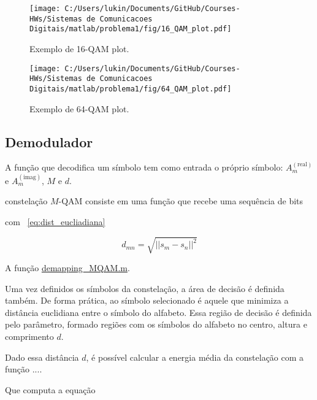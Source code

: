 \clearpage

\begin{figure}[!ht]
    \centering
    \texttt{[image: C:/Users/lukin/Documents/GitHub/Courses-HWs/Sistemas de Comunicacoes Digitais/matlab/problema1/fig/16\_QAM\_plot.pdf]}
    \caption{Exemplo de 16-QAM plot.}
    \label{fig:16_QAM_plot}
\end{figure}

\begin{figure}[!ht]
    \centering
    \texttt{[image: C:/Users/lukin/Documents/GitHub/Courses-HWs/Sistemas de Comunicacoes Digitais/matlab/problema1/fig/64\_QAM\_plot.pdf]}
    \caption{Exemplo de 64-QAM plot.}
    \label{fig:64_QAM_plot}
\end{figure}

\clearpage

\subsection{Demodulador}


A função que decodifica um símbolo tem como entrada o próprio símbolo: $A_m^{(\text{real})}$ e $A_m^{(\text{imag})}$, $M$ e $d$.

constelação $M$-QAM consiste em uma função que recebe uma sequência de bits

com ~\ref{eq:dist_eucliadiana}

\begin{equation}
    d_{mn} = \sqrt{|| s_m - s_n||^2}
    \label{eq:dist_eucliadiana}
\end{equation}

A função \href{https://raw.githubusercontent.com/lucasabdalah/Courses-HWs/SCD/Sistemas%20de%20Comunicacoes%20Digitais/matlab/problema1/demapping_MQAM.m}{demapping\_MQAM.m}.

Uma vez definidos os símbolos da constelação, a área de decisão é definida também. De forma prática,  ao símbolo selecionado é aquele que minimiza a distância euclidiana entre o símbolo do alfabeto. Essa região de decisão é definida pelo parâmetro, formado regiões com os símbolos do alfabeto no centro, altura e comprimento $d$.

Dado essa distância $d$, é possível calcular a energia média da constelação com a função ....

Que computa a equação

